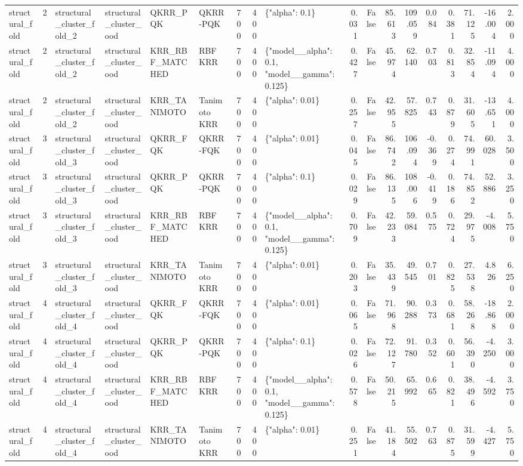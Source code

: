 \begin{tabular}{lrllllrrlrrrrrrrrr}
structural\_fold & 2 & structural\_cluster\_fold\_2 & structural\_cluster\_ood & QKRR\_PQK & QKRR-PQK & 700 & 400 & \{"alpha": 0.1\} & 0.031 & False & 85.613 & 109.059 & 0.084 & 0.381 & 71.125 & -16.004 & 2.000 \\
structural\_fold & 2 & structural\_cluster\_fold\_2 & structural\_cluster\_ood & KRR\_RBF\_MATCHED & RBF KRR & 700 & 400 & \{"model\_\_alpha": 0.1, "model\_\_gamma": 0.125\} & 0.427 & False & 45.974 & 62.140 & 0.703 & 0.813 & 32.854 & -11.094 & 4.000 \\
structural\_fold & 2 & structural\_cluster\_fold\_2 & structural\_cluster\_ood & KRR\_TANIMOTO & Tanimoto KRR & 700 & 400 & \{"alpha": 0.01\} & 0.257 & False & 42.955 & 57.825 & 0.743 & 0.879 & 31.605 & -13.651 & 4.000 \\
structural\_fold & 3 & structural\_cluster\_fold\_3 & structural\_cluster\_ood & QKRR\_FQK & QKRR-FQK & 700 & 400 & \{"alpha": 0.01\} & 0.045 & False & 86.742 & 106.094 & -0.369 & 0.274 & 74.991 & 60.028 & 3.500 \\
structural\_fold & 3 & structural\_cluster\_fold\_3 & structural\_cluster\_ood & QKRR\_PQK & QKRR-PQK & 700 & 400 & \{"alpha": 0.1\} & 0.029 & False & 86.135 & 108.006 & -0.419 & 0.186 & 74.852 & 52.886 & 3.250 \\
structural\_fold & 3 & structural\_cluster\_fold\_3 & structural\_cluster\_ood & KRR\_RBF\_MATCHED & RBF KRR & 700 & 400 & \{"model\_\_alpha": 0.1, "model\_\_gamma": 0.125\} & 0.709 & False & 42.233 & 59.084 & 0.575 & 0.724 & 29.975 & -4.008 & 5.750 \\
structural\_fold & 3 & structural\_cluster\_fold\_3 & structural\_cluster\_ood & KRR\_TANIMOTO & Tanimoto KRR & 700 & 400 & \{"alpha": 0.01\} & 0.203 & False & 35.439 & 49.545 & 0.701 & 0.825 & 27.538 & 4.826 & 6.250 \\
structural\_fold & 4 & structural\_cluster\_fold\_4 & structural\_cluster\_ood & QKRR\_FQK & QKRR-FQK & 700 & 400 & \{"alpha": 0.01\} & 0.065 & False & 71.968 & 90.288 & 0.373 & 0.681 & 58.268 & -18.868 & 2.000 \\
structural\_fold & 4 & structural\_cluster\_fold\_4 & structural\_cluster\_ood & QKRR\_PQK & QKRR-PQK & 700 & 400 & \{"alpha": 0.1\} & 0.026 & False & 72.127 & 91.780 & 0.352 & 0.601 & 56.390 & -4.250 & 3.000 \\
structural\_fold & 4 & structural\_cluster\_fold\_4 & structural\_cluster\_ood & KRR\_RBF\_MATCHED & RBF KRR & 700 & 400 & \{"model\_\_alpha": 0.1, "model\_\_gamma": 0.125\} & 0.578 & False & 50.215 & 65.992 & 0.665 & 0.821 & 38.496 & -4.592 & 3.750 \\
structural\_fold & 4 & structural\_cluster\_fold\_4 & structural\_cluster\_ood & KRR\_TANIMOTO & Tanimoto KRR & 700 & 400 & \{"alpha": 0.01\} & 0.251 & False & 41.184 & 55.502 & 0.763 & 0.875 & 31.599 & -4.427 & 5.750 \\
\bottomrule
\end{tabular}
